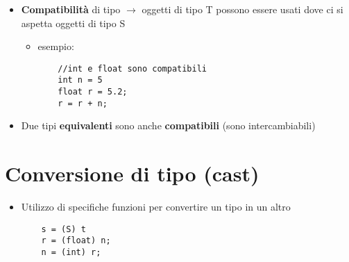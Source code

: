 \documentclass[12pt]{extarticle}
\begin{document}
\begin{flushleft}
\begin{itemize}
  \item \textbf{Compatibilità} di tipo $\rightarrow$ oggetti di tipo T possono essere usati dove ci si aspetta oggetti di tipo S
  \begin{itemize}
  \item esempio:
  \begin{lstlisting}
    //int e float sono compatibili
    int n = 5
    float r = 5.2;
    r = r + n;
  \end{lstlisting}
  \end{itemize}
  \item Due tipi \textbf{equivalenti} sono anche \textbf{compatibili} (sono intercambiabili)
\end{itemize}

\section*{Conversione di tipo (cast)}
\begin{itemize}
  \item Utilizzo di specifiche funzioni per convertire un tipo in un altro
  \begin{lstlisting}
    s = (S) t
    r = (float) n;
    n = (int) r;
  \end{lstlisting}
\end{itemize}


\end{flushleft}
\end{document}
